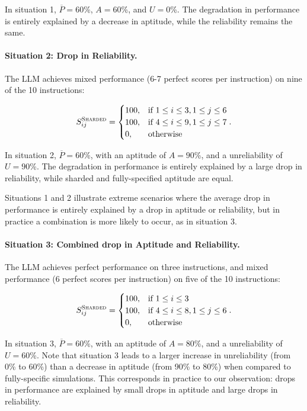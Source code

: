 \documentclass{article}
\begin{document}
\begin{appendices}
In situation 1, $\overline{P}=60$\%, $A=60$\%, and $U=0$\%. The degradation in performance is entirely explained by a decrease in aptitude, while the reliability remains the same.

\paragraph{Situation 2: Drop in Reliability.}

The LLM achieves mixed performance (6-7 perfect scores per instruction) on nine of the 10 instructions:

$$
S^{\textsc{Sharded}}_{ij} = 
\begin{cases}
100, & \text{if } 1 \leq i \leq 3, 1 \leq j \leq 6 \\
100, & \text{if } 4 \leq i \leq 9, 1 \leq j \leq 7 \\
0,   & \text{otherwise} 
\end{cases}.
$$

In situation 2, $\overline{P} = 60$\%, with an aptitude of $A=90$\%, and a unreliability of $U=90$\%. The degradation in performance is entirely explained by a large drop in reliability, while sharded and fully-specified aptitude are equal.

Situations 1 and 2 illustrate extreme scenarios where the average drop in performance is entirely explained by a drop in aptitude or reliability, but in practice a combination is more likely to occur, as in situation 3.

\paragraph{Situation 3: Combined drop in Aptitude and Reliability.}

The LLM achieves perfect performance on three instructions, and mixed performance (6 perfect scores per instruction) on five of the 10 instructions:

$$
S^{\textsc{Sharded}}_{ij} = 
\begin{cases}
100, & \text{if } 1 \leq i \leq 3 \\
100, & \text{if } 4 \leq i \leq 8, 1 \leq j \leq 6 \\
0,   & \text{otherwise} 
\end{cases}.
$$

In situation 3, $\overline{P} = 60$\%, with an aptitude of $A=80$\%, and a unreliability of $U=60$\%. Note that situation 3 leads to a larger increase in unreliability (from 0\% to 60\%) than a decrease in aptitude (from 90\% to 80\%) when compared to fully-specific simulations. This corresponds in practice to our observation: drops in performance are explained by small drops in aptitude and large drops in reliability.


\end{appendices}
\end{document}
